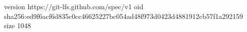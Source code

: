 version https://git-lfs.github.com/spec/v1
oid sha256:ed9f6acf6d835c0cc46625227bc054ad48f973d0423d4881912cb57f1a292159
size 1048
